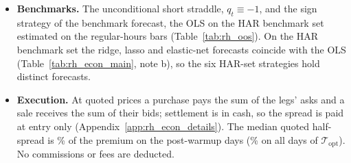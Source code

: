 \begin{itemize}
\[  \]
  long when the forecast variance $\hat\sigma^2_t$ of the closing bar (Section~\ref{sec:rh_methods_setup}) exceeds
  the implied variance and short otherwise (ties go short); $\mathrm{IV}_t^2 - \hat\sigma^2_t$ is the forecast of the
  half hour's variance risk premium \citep{CarrWu2009,BollerslevTauchenZhou2009}.
\item \textbf{Benchmarks.} The unconditional short straddle, $q_t \equiv -1$, and the sign strategy of the benchmark
  forecast, the OLS on the HAR benchmark set estimated on the \rhePoolNBars{} regular-hours bars
  (Table~\ref{tab:rh_oos}). On the HAR benchmark set the ridge, lasso and elastic-net forecasts coincide with
  the OLS (Table~\ref{tab:rh_econ_main}, note b), so the six HAR-set strategies hold \rhemHarDistinctWord{} distinct
  forecasts.
\item \textbf{Execution.} At quoted prices a purchase pays the sum of the legs' asks and a sale receives the sum of
  their bids; settlement is in cash, so the spread is paid at entry only (Appendix~\ref{app:rh_econ_details}). The
  median quoted half-spread is \rhemHalfSpreadMed\% of the premium on the \rheSzDays{} post-warmup days
  (\rhemHalfSpreadMedAll\% on all \cmNdays{} days of $\mathcal T_{\mathrm{opt}}$). No commissions or fees are
  deducted.
\end{itemize}

